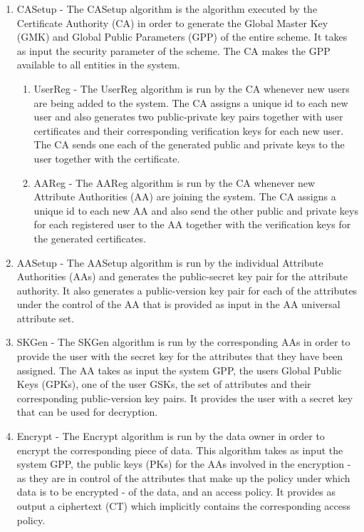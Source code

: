 \begin{enumerate}[label=(\arabic*)]
	
	\item CASetup - The CASetup algorithm is the algorithm executed by the Certificate Authority (CA) in order to generate the Global Master Key (GMK) and Global Public Parameters (GPP) of the entire scheme. It takes as input the security parameter of the scheme.  The CA makes the GPP available to all entities in the system.
	
	\begin{enumerate}
		
		\item UserReg - The UserReg algorithm is run by the CA whenever new users are being added to the system. The CA assigns a unique id to each new user and also generates two public-private key pairs together with user certificates and their corresponding verification keys for each new user. The CA sends one each of the generated public and private keys to the user together with the certificate.
		
		\item AAReg - The AAReg algorithm is run by the CA whenever new Attribute Authorities (AA) are joining the system. The CA assigns a unique id to each new AA and also send the other public and private keys for each registered user to the AA together with the verification keys for the generated certificates.
		
	\end{enumerate}
	
	\item AASetup - The AASetup algorithm is run by the individual Attribute Authorities (AAs) and generates the public-secret key pair for the attribute authority. It also generates a public-version key pair for each of the attributes under the control of the AA that is provided as input in the AA universal attribute set.
	
	\item SKGen - The SKGen algorithm is run by the corresponding AAs in order to provide the user with the secret key for the attributes that they have been assigned. The AA takes as input the system GPP, the users Global Public Keys (GPKs), one of the user GSKs, the set of attributes and their corresponding public-version key pairs. It provides the user with a secret key that can be used for decryption.
	
	\item Encrypt - The Encrypt algorithm is run by the data owner in order to encrypt the corresponding piece of data. This algorithm takes as input the system GPP, the public keys (PKs) for the AAs involved in the encryption - as they are in control of the attributes that make up the policy under which data is to be encrypted - of the data, and an access policy. It provides as output a ciphertext (CT) which implicitly contains the corresponding access policy.
	

\end{enumerate}
